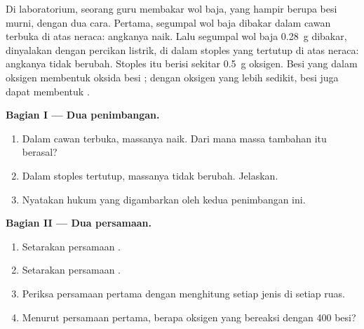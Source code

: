\begin{problem}
\label{pb:g8:balanced-equations:1}
Di laboratorium, seorang guru membakar wol baja, yang hampir berupa besi
murni, dengan dua cara. Pertama, segumpal wol baja dibakar dalam cawan
terbuka di atas neraca: angkanya naik. Lalu segumpal wol baja
\qty{0.28}{g} dibakar, dinyalakan dengan percikan listrik, di dalam
stoples  yang tertutup di atas neraca: angkanya tidak berubah.
Stoples itu berisi sekitar \qty{0.5}{g} oksigen. Besi yang 
dalam oksigen membentuk oksida besi ; dengan oksigen yang
lebih sedikit, besi juga dapat membentuk .

\medskip
\noindent\textbf{Bagian I --- Dua penimbangan.}
\begin{enumerate}
  \item Dalam cawan terbuka, massanya naik. Dari mana massa tambahan itu
        berasal?
  \item Dalam stoples tertutup, massanya tidak berubah. Jelaskan.
  \item Nyatakan hukum yang digambarkan oleh kedua penimbangan ini.
\end{enumerate}

\medskip
\noindent\textbf{Bagian II --- Dua persamaan.}
\begin{enumerate}[resume]
  \item Setarakan persamaan . %
  \item Setarakan persamaan . %
  \item Periksa persamaan pertama dengan menghitung  setiap jenis di
        setiap ruas.
  \item Menurut persamaan pertama, berapa  oksigen yang bereaksi
        dengan 400  besi?
\end{enumerate}


\end{problem}
